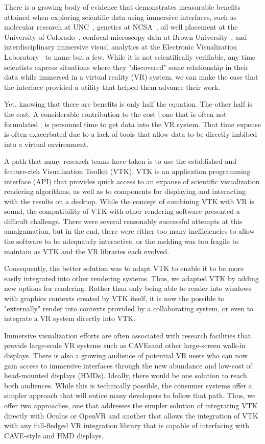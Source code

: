 There is a growing body of evidence that demonstrates measurable benefits
attained when exploring scientific data using immersive interfaces, such as
molecular research at UNC~\cite{Brooks:1990},
genetics at NCSA~\cite{Brady:1995},
oil well placement at the University of Colorado~\cite{Gruchalla:2004},  confocal microscopy data at Brown University~\cite{Prabhat:2008}, and interdisciplinary immersive visual analytics at the Electronic Visualization Laboratory~\cite{Marai:2016} to name but a few.
While it is not scientifically verifiable, any time scientists
express situations where they "discovered" some relationship in their data
while immersed in a virtual reality (VR) system, we can make the case that the
interface provided a utility that helped them advance their work.

Yet, knowing that there are benefits is only half the equation.
The other half is the cost.
A considerable contribution to the cost | one that is often not
formulated | is personnel time to get data into the VR system.
That time expense is often exacerbated due to a lack of tools that
allow data to be directly imbibed into a virtual environment.

A path that many research teams have taken is to use the established and
feature-rich Visualization Toolkit (VTK).
VTK is an application programming interface (API) that provides quick access to an expanse
of scientific visualization rendering algorithms, as well as to components
for displaying and interacting with the results on a desktop.
While the concept of combining VTK with VR is sound, the
compatibility of VTK with other rendering software presented a difficult
challenge.  
There were several reasonably successful attempts at this amalgamation,
but in the end, there were either too many inefficiencies to allow the
software to be adequately interactive, or the melding was too fragile to
maintain as VTK and the VR libraries each evolved.

Consequently, the better solution was to adapt VTK to enable it to be
more easily integrated into other rendering systems.
Thus, we adapted VTK by adding new options for rendering.
Rather than only being able to render into windows with graphics contexts
created by VTK itself, it is now the possible to "externally" render
into contexts provided by a collaborating system, or even to integrate a
VR system directly into VTK.

Immersive visualization efforts are often associated with research
facilities that provide large-scale VR systems such as CAVEs\texttrademark and
other large-screen walk-in displays.
There is also a growing audience of potential VR users who can now
gain access to immersive interfaces through the new abundance and low-cost
of head-mounted displays (HMDs).
Ideally, there would be one solution to reach both audiences. While this is
technically possible, the consumer systems offer a simpler
approach that will entice many developers to follow that path.
Thus, we offer two approaches, one that addresses the simpler solution
of integrating VTK directly with Oculus or OpenVR and another that allows the integration of VTK with
any full-fledged VR integration library that is capable of interfacing
with CAVE-style and HMD displays.


